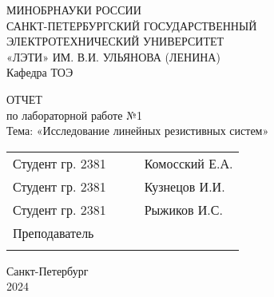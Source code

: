 \clearpage
\begin{center}
	МИНОБРНАУКИ РОССИИ\\
	САНКТ-ПЕТЕРБУРГСКИЙ ГОСУДАРСТВЕННЫЙ\\
	ЭЛЕКТРОТЕХНИЧЕСКИЙ УНИВЕРСИТЕТ\\
	«ЛЭТИ» ИМ. В.И. УЛЬЯНОВА (ЛЕНИНА)\\
	Кафедра ТОЭ
	\vspace{54mm}

	ОТЧЕТ\\
	по лабораторной работе №1 \\
	Тема: «Исследование линейных резистивных систем» \\




	\vfill
	\def\arraystretch{1.5}
	\begin{tabularx}{\textwidth}{ >{\hsize=7cm}X >{\hsize=4cm}X >{\hsize=1mm}X >{\centering\arraybackslash}X }
		Студент гр. 2381 &  &  & Комосский Е.А. \\
		Студент гр. 2381 &  &  & Кузнецов И.И.  \\
		Студент гр. 2381 &  &  & Рыжиков И.С.   \\
		Преподаватель    &  &  &                \\ \cline{2-2} \cline{4-4}
	\end{tabularx}
	\def\arraystretch{1}

	\vspace{25mm}

	Санкт-Петербург\\
	2024
\end{center}
\newpage
